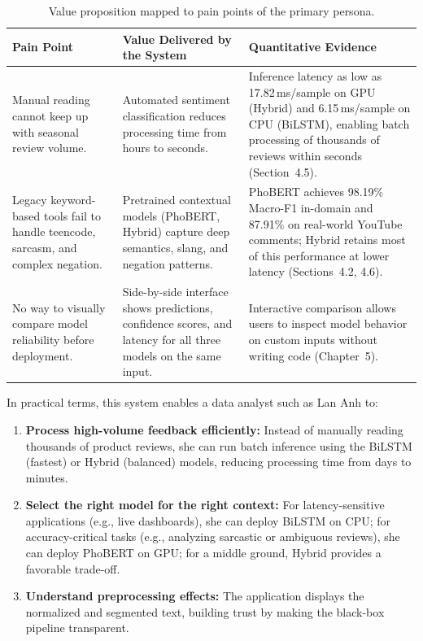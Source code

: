 \documentclass[12pt]{report} %
\begin{document}
\begin{table}[H]
    \centering
    \caption{Value proposition mapped to pain points of the primary persona.}
    \label{tab:value-proposition}
    \begin{tabular}{p{3.5cm}p{5cm}p{4cm}}
        \hline
        \textbf{Pain Point}                                                                & \textbf{Value Delivered by the System}                                                                           & \textbf{Quantitative Evidence}                                                                                                                                                    \\
        \hline
        Manual reading cannot keep up with seasonal review volume.                         & Automated sentiment classification reduces processing time from hours to seconds.                                & Inference latency as low as 17.82\,ms/sample on GPU (Hybrid) and 6.15\,ms/sample on CPU (BiLSTM), enabling batch processing of thousands of reviews within seconds (Section~4.5). \\
        Legacy keyword-based tools fail to handle teencode, sarcasm, and complex negation. & Pretrained contextual models (PhoBERT, Hybrid) capture deep semantics, slang, and negation patterns.             & PhoBERT achieves 98.19\% Macro-F1 in-domain and 87.91\% on real-world YouTube comments; Hybrid retains most of this performance at lower latency (Sections~4.2, 4.6).             \\
        No way to visually compare model reliability before deployment.                    & Side-by-side interface shows predictions, confidence scores, and latency for all three models on the same input. & Interactive comparison allows users to inspect model behavior on custom inputs without writing code (Chapter~5).                                                                  \\
        \hline
    \end{tabular}
\end{table}

In practical terms, this system enables a data analyst such as Lan Anh to:
\begin{enumerate}
    \item \textbf{Process high-volume feedback efficiently:} Instead of manually reading thousands of product reviews, she can run batch inference using the BiLSTM (fastest) or Hybrid (balanced) models, reducing processing time from days to minutes.
    \item \textbf{Select the right model for the right context:} For latency-sensitive applications (e.g., live dashboards), she can deploy BiLSTM on CPU; for accuracy-critical tasks (e.g., analyzing sarcastic or ambiguous reviews), she can deploy PhoBERT on GPU; for a middle ground, Hybrid provides a favorable trade-off.
    \item \textbf{Understand preprocessing effects:} The application displays the normalized and segmented text, building trust by making the black-box pipeline transparent.
\end{enumerate}
\end{document}
